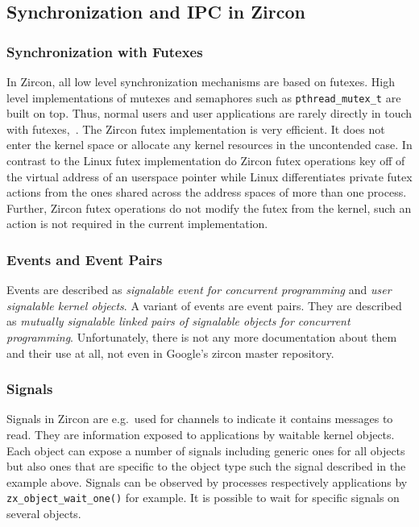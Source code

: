 \subsection{Synchronization and IPC in Zircon}

\subsubsection*{Synchronization with Futexes}
In Zircon, all low level synchronization mechanisms are based on futexes.
High level implementations of mutexes and semaphores such as \texttt{pthread\_mutex\_t} are built on top.
Thus, normal users and user applications are rarely directly in touch with futexes\cite{zircon-concepts},~\cite{zircon-futex}.
The Zircon futex implementation is very efficient.
It does not enter the kernel space or allocate any kernel resources in the uncontended case.
In contrast to the Linux futex implementation do Zircon futex operations key off of the virtual address of an userspace pointer while Linux differentiates private futex actions from the ones shared across the address spaces of more than one process.
Further, Zircon futex operations do not modify the futex from the kernel, such an action is not required in the current implementation\cite{zircon-futex}.

\subsubsection*{Events and Event Pairs}
Events are described as \textit{signalable event for concurrent programming}\cite{zircon-event} and \textit{user signalable kernel objects}\cite{zircon-event}.
A variant of events are event pairs.
They are described as \textit{mutually signalable linked pairs of signalable objects for concurrent programming}\cite{zircon-eventpair}.
Unfortunately, there is not any more documentation about them and their use at all, not even in Google's zircon master repository.

\subsubsection*{Signals}
Signals in Zircon are e.g.\ used for channels to indicate it contains messages to read.
They are information exposed to applications by waitable kernel objects.
Each object can expose a number of signals including generic ones for all objects but also ones that are specific to the object type such the signal described in the example above.
Signals can be observed by processes respectively applications by \texttt{zx\_object\_wait\_one()} for example.
It is possible to wait for specific signals on several objects\cite{zircon-signals}.

